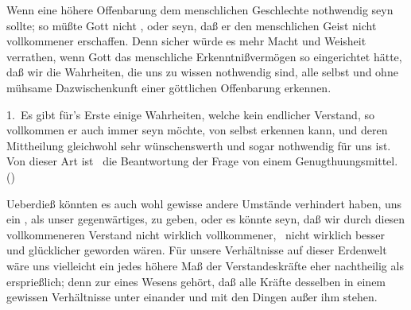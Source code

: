 Wenn eine höhere Offenbarung dem menschlichen Geschlechte nothwendig seyn sollte; so müßte Gott nicht , oder  seyn, daß er den menschlichen Geist nicht vollkommener erschaffen. Denn sicher würde es mehr Macht und Weisheit verrathen, wenn Gott das menschliche Erkenntnißvermögen so eingerichtet hätte, daß wir die Wahrheiten, die uns zu wissen nothwendig sind, alle selbst und ohne mühsame Dazwischenkunft einer göttlichen Offenbarung erkennen.\par
{} 1.~Es gibt für's Erste einige Wahrheiten, welche kein endlicher Verstand, so vollkommen er auch immer seyn möchte, von selbst erkennen kann, und deren Mittheilung gleichwohl sehr wünschenswerth und sogar nothwendig für uns ist. Von dieser Art ist \zB\ die Beantwortung der Frage von einem Genugthuungsmittel. ()
\begin{aufza}\setcounter{enumi}{1}
\item Ueberdieß könnten es auch wohl gewisse andere Umstände verhindert haben, uns ein , als unser gegenwärtiges, zu geben, oder es könnte seyn, daß wir durch diesen vollkommeneren Verstand nicht wirklich vollkommener, \dh\ nicht wirklich besser und glücklicher geworden wären. Für unsere Verhältnisse auf dieser Erdenwelt wäre uns vielleicht ein jedes höhere Maß der Verstandeskräfte eher nachtheilig als ersprießlich; denn zur  eines Wesens gehört, daß alle Kräfte desselben in einem gewissen Verhältnisse unter einander und mit den Dingen außer ihm stehen.
\end{aufza}

